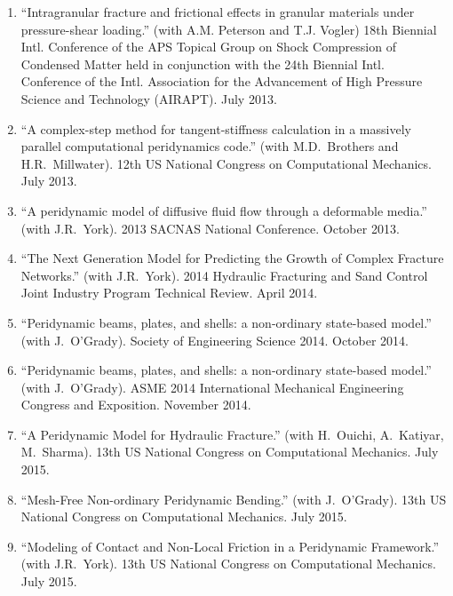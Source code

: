 \ifdefined\iscockrell
\begin{enumerate}
  \item ``Intragranular fracture and frictional effects in granular materials under pressure-shear loading.'' (with A.M. Peterson and T.J. Vogler) 18th Biennial Intl. Conference of the APS Topical Group on Shock Compression of Condensed Matter held in conjunction with the 24th Biennial Intl. Conference of the Intl. Association for the Advancement of High Pressure Science and Technology (AIRAPT). July 2013.
  \item ``A complex-step method for tangent-stiffness calculation in a massively parallel computational peridynamics code.'' (with M.D.~Brothers and H.R.~Millwater). 12th US National Congress on Computational Mechanics. July 2013.
  \item ``A peridynamic model of diffusive fluid flow through a deformable media.'' (with J.R.~York). 2013 SACNAS National Conference. October 2013.
  \item ``The Next Generation Model for Predicting the Growth of Complex Fracture Networks.'' (with J.R.~York). 2014 Hydraulic Fracturing and Sand Control Joint Industry Program Technical Review.  April 2014.
  \item ``Peridynamic beams, plates, and shells: a non-ordinary state-based model.'' (with J.~O'Grady). Society of Engineering Science 2014. October 2014.
  \item ``Peridynamic beams, plates, and shells: a non-ordinary state-based model.'' (with J.~O'Grady). ASME 2014 International Mechanical Engineering Congress and Exposition. November 2014.
  \item ``A Peridynamic Model for Hydraulic Fracture.'' (with H.~Ouichi, A.~Katiyar, M.~Sharma). 13th US National Congress on Computational Mechanics. July 2015.
  \item ``Mesh-Free Non-ordinary Peridynamic Bending.'' (with J.~O'Grady). 13th US National Congress on Computational Mechanics. July 2015.
  \item ``Modeling of Contact and Non-Local Friction in a Peridynamic Framework.'' (with J.R.~York). 13th US National Congress on Computational Mechanics. July 2015.
\end{enumerate}
\else
\ifdefined\ispdf
